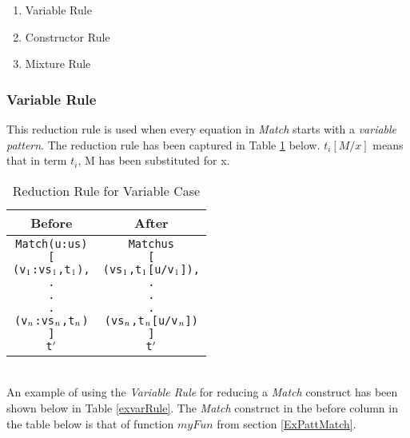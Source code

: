 \documentclass[11pt]{article}
\begin{document}
\begin {enumerate}
   \item Variable Rule
   \item Constructor Rule 
   \item Mixture Rule 
\end {enumerate}
\subsubsection {Variable Rule} 
This reduction rule is used when every equation in {\em Match} starts with a {\em variable  pattern}. The reduction rule has been captured in Table \ref {varRule} below. $t_i[M/x]$ means that in term $t_i$, M has been substituted for x.        
\begin{table}[h!]
\begin{center}
\begin{tabular}{|c|c|} \hline
{\bf Before} & {\bf After} \\ 
\hline
\begin{minipage}{2in}
 \begin{alltt}

Match (u:us) 
         [
          (v\(\sb{1}\):vs\(\sb{1}\),t\(\sb{1}\)),
             .
             .
             .
          (v\(\sb{n}\):vs\(\sb{n}\),t\(\sb{n}\))
         ]
         t\(\sp{\prime}\)  

\end{alltt} 
\end {minipage} &
\begin{minipage}{2in}
\begin{alltt}

Match us 
     [
      (vs\(\sb{1}\),t\(\sb{1}\)[u/v\(\sb{1}\)]),
         .
         .
         .
      (vs\(\sb{n}\),t\(\sb{n}\)[u/v\(\sb{n}\)])
     ] 
     t\(\sp{\prime}\) 

\end{alltt} 
\end {minipage}
\tabularnewline
\hline
\end{tabular}
\caption{Reduction Rule for Variable Case}
\label{varRule}
\end{center}
\end{table}
~~\\
An example of using the {\em Variable Rule} for reducing a {\em Match} construct has been shown below in Table \ref {exvarRule}.
The {\em Match} construct in the before column in the table below is that of function $myFun$ from section \ref {ExPattMatch}.   
\end{document}

